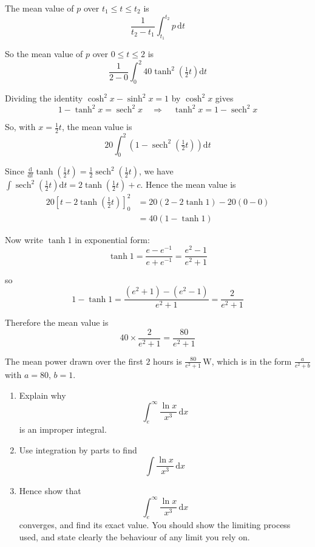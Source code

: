 \documentclass[leqno]{article}
\begin{document}
\begin{enumerate}[
  label=\textbf{\arabic*.},
  leftmargin=*,
  topsep=0pt,
  partopsep=0pt,
  parsep=0pt
]
\vspace*{10pt}

\begin{djsSolution}
The mean value of \(p\) over \(t_1\le t\le t_2\) is
\[
\dfrac{1}{t_2-t_1}\int_{t_1}^{t_2} p\,\mathrm{d}t
\]

So the mean value of \(p\) over \(0\le t\le 2\) is
\[
\frac{1}{2-0}\int_0^2 40\tanh^2\left(\tfrac{1}{2}t\right)\mathrm{d}t
\]

Dividing the identity \(\cosh^2 x-\sinh^2 x=1\) by \(\cosh^2 x\) gives
\[
1-\tanh^2 x=\operatorname{sech}^2 x\quad\Longrightarrow\quad \tanh^2 x=1-\operatorname{sech}^2 x
\]

So, with \(x=\frac{1}{2}t\), the mean value is
\[
20\int_0^2 \left(1-\operatorname{sech}^2\left(\tfrac{1}{2}t\right)\right)\mathrm{d}t
\]

Since \(\frac{\mathrm{d}}{\mathrm{d}t}\tanh\left(\frac{1}{2}t\right)=\frac{1}{2}\operatorname{sech}^2\left(\frac{1}{2}t\right)\), we have \(\int\operatorname{sech}^2\left(\frac{1}{2}t\right)\mathrm{d}t=2\tanh\left(\frac{1}{2}t\right)+c\). Hence the mean value is
\begin{align*}
20\left[t-2\tanh\left(\tfrac{1}{2}t\right)\right]_0^2&=20\left(2-2\tanh 1\right)-20(0-0)\\
&=40\left(1-\tanh 1\right)
\end{align*}

Now write \(\tanh 1\) in exponential form:
\[
\tanh 1=\frac{e-e^{-1}}{e+e^{-1}}=\frac{e^2-1}{e^2+1}
\]

so
\[
1-\tanh 1=\frac{(e^2+1)-(e^2-1)}{e^2+1}=\frac{2}{e^2+1}
\]

Therefore the mean value is
\[
40\times\frac{2}{e^2+1}=\frac{80}{e^2+1}
\]

The mean power drawn over the first \(2\) hours is \(\frac{80}{e^2+1}\,\mathrm{W}\), which is in the form \(\frac{a}{e^2+b}\) with \(a=80\), \(b=1\).
\end{djsSolution}

\newpage

\questionitem

\begin{enumerate}[label=\textbf{(\alph*)}]
  \item Explain why
  \[\int_{e}^{\infty} \dfrac{\ln x}{x^{3}}\,\mathrm{d}x\]
  is an improper integral.  \\
  \item Use integration by parts to find
  \[\int \dfrac{\ln x}{x^{3}}\,\mathrm{d}x\] 
  \item Hence show that
  \[\int_{e}^{\infty} \dfrac{\ln x}{x^{3}}\,\mathrm{d}x\]
  converges, and find its exact value. You should show the limiting process used, and state clearly the behaviour of any limit you rely on.  \\
\end{enumerate}


\end{enumerate}
\end{document}
